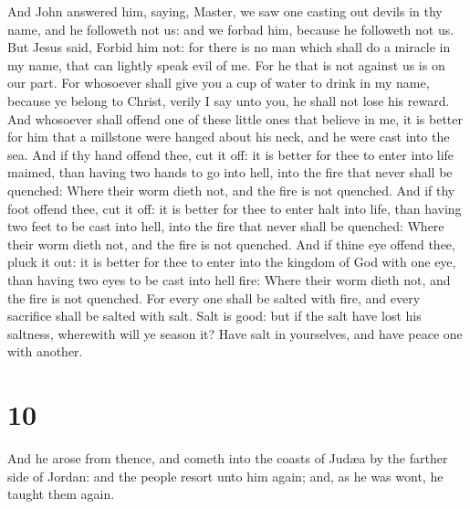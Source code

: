  And John answered him, saying, Master, we saw one
casting out devils in thy name, and he followeth not us: and we forbad
him, because he followeth not us.  But Jesus said, Forbid
him not: for there is no man which shall do a miracle in my name, that
can lightly speak evil of me.  For he that is not against
us is on our part.  For whosoever shall give you a cup of
water to drink in my name, because ye belong to Christ, verily I say
unto you, he shall not lose his reward.  And whosoever
shall offend one of these little ones that believe in me, it is better
for him that a millstone were hanged about his neck, and he were cast
into the sea.  And if thy hand offend thee, cut it off:
it is better for thee to enter into life maimed, than having two hands
to go into hell, into the fire that never shall be quenched:
 Where their worm dieth not, and the fire is not
quenched.  And if thy foot offend thee, cut it off: it is
better for thee to enter halt into life, than having two feet to be cast
into hell, into the fire that never shall be quenched: 
Where their worm dieth not, and the fire is not quenched.
 And if thine eye offend thee, pluck it out: it is better
for thee to enter into the kingdom of God with one eye, than having two
eyes to be cast into hell fire:  Where their worm dieth
not, and the fire is not quenched.  For every one shall
be salted with fire, and every sacrifice shall be salted with salt.
 Salt is good: but if the salt have lost his saltness,
wherewith will ye season it? Have salt in yourselves, and have peace one
with another.

\hypertarget{section-9}{%
\section{10}\label{section-9}}

 And he arose from thence, and cometh into the coasts of
Judæa by the farther side of Jordan: and the people resort unto him
again; and, as he was wont, he taught them again.

